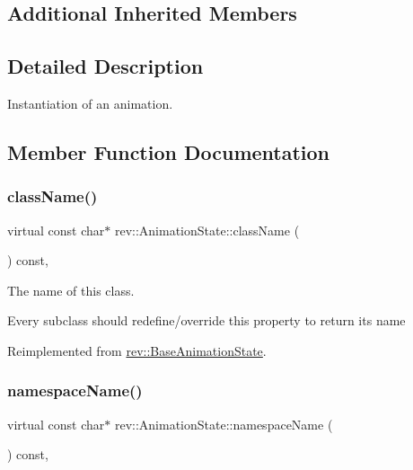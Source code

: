 \subsection*{Additional Inherited Members}


\subsection{Detailed Description}
Instantiation of an animation. 

\subsection{Member Function Documentation}
\mbox{\label{classrev_1_1_animation_state_a4d204d9ea91c34e1a546421dcc80f0e5}} 
\subsubsection{\texorpdfstring{className()}{className()}}
{\footnotesize\ttfamily virtual const char$\ast$ rev\+::\+Animation\+State\+::class\+Name (\begin{DoxyParamCaption}{ }\end{DoxyParamCaption}) const\hspace{0.3cm}{\ttfamily [inline]}, {\ttfamily [virtual]}}



The name of this class. 

Every subclass should redefine/override this property to return its name 

Reimplemented from \mbox{\hyperlink{classrev_1_1_base_animation_state_a40d8ab21aeed4a7d7e0f88004c08d060}{rev\+::\+Base\+Animation\+State}}.

\mbox{\label{classrev_1_1_animation_state_abaccd2a331d4b77be5942e5e907be3dc}} 
\subsubsection{\texorpdfstring{namespaceName()}{namespaceName()}}
{\footnotesize\ttfamily virtual const char$\ast$ rev\+::\+Animation\+State\+::namespace\+Name (\begin{DoxyParamCaption}{ }\end{DoxyParamCaption}) const\hspace{0.3cm}{\ttfamily [inline]}, {\ttfamily [virtual]}}



